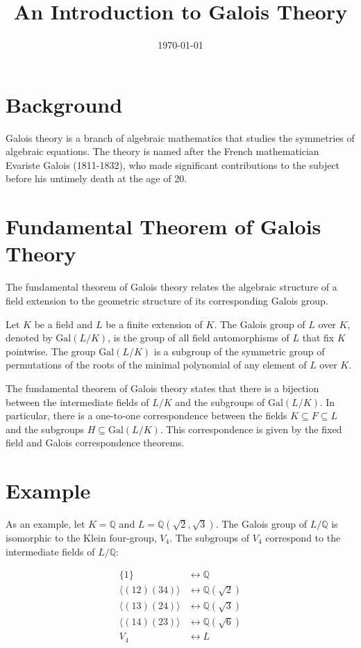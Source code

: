 \documentclass{article}
\begin{document}
\title{An Introduction to Galois Theory}
\date{\today}

\maketitle

\section{Background}

Galois theory is a branch of algebraic mathematics that studies the symmetries of algebraic equations. The theory is named after the French mathematician Evariste Galois (1811-1832), who made significant contributions to the subject before his untimely death at the age of 20.

\section{Fundamental Theorem of Galois Theory}

The fundamental theorem of Galois theory relates the algebraic structure of a field extension to the geometric structure of its corresponding Galois group.

Let $K$ be a field and $L$ be a finite extension of $K$. The Galois group of $L$ over $K$, denoted by $\text{Gal}(L/K)$, is the group of all field automorphisms of $L$ that fix $K$ pointwise. The group $\text{Gal}(L/K)$ is a subgroup of the symmetric group of permutations of the roots of the minimal polynomial of any element of $L$ over $K$.

The fundamental theorem of Galois theory states that there is a bijection between the intermediate fields of $L/K$ and the subgroups of $\text{Gal}(L/K)$. In particular, there is a one-to-one correspondence between the fields $K \subseteq F \subseteq L$ and the subgroups $H \subseteq \text{Gal}(L/K)$. This correspondence is given by the fixed field and Galois correspondence theorems.

\section{Example}

As an example, let $K = \mathbb{Q}$ and $L = \mathbb{Q}(\sqrt{2},\sqrt{3})$. The Galois group of $L/\mathbb{Q}$ is isomorphic to the Klein four-group, $V_4$. The subgroups of $V_4$ correspond to the intermediate fields of $L/\mathbb{Q}$:

\begin{align*}
\{1\} &\longleftrightarrow \mathbb{Q} \\
\langle (12)(34) \rangle &\longleftrightarrow \mathbb{Q}(\sqrt{2}) \\
\langle (13)(24) \rangle &\longleftrightarrow \mathbb{Q}(\sqrt{3}) \\
\langle (14)(23) \rangle &\longleftrightarrow \mathbb{Q}(\sqrt{6}) \\
V_4 &\longleftrightarrow L
\end{align*}
\end{document}

